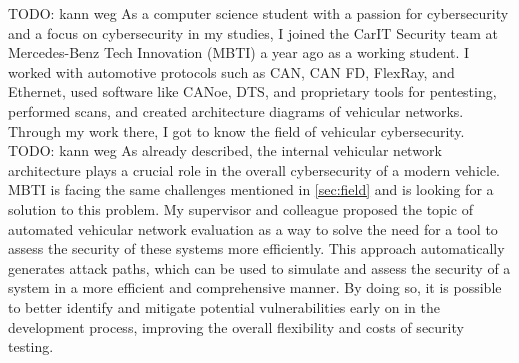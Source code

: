 TODO: kann weg
As a computer science student with a passion for cybersecurity and a focus on cybersecurity in my studies, I joined the CarIT Security team at Mercedes-Benz Tech Innovation (MBTI) a year ago as a working student. 
I worked with automotive protocols such as CAN, CAN FD, FlexRay, and Ethernet, used software like CANoe, DTS, and proprietary tools for pentesting, performed scans, and created architecture diagrams of vehicular networks. 
Through my work there, I got to know the field of vehicular cybersecurity.
\\

TODO: kann weg
As already described, the internal vehicular network architecture plays a crucial role in the overall cybersecurity of a modern vehicle. 
MBTI is facing the same challenges mentioned in \ref{sec:field} and is looking for a solution to this problem. 
My supervisor and colleague proposed the topic of automated vehicular network evaluation as a way to solve the need for a tool to assess the security of these systems more efficiently. 
This approach automatically generates attack paths, which can be used to simulate and assess the security of a system in a more efficient and comprehensive manner. 
By doing so, it is possible to better identify and mitigate potential vulnerabilities early on in the development process, improving the overall flexibility and costs of security testing.


